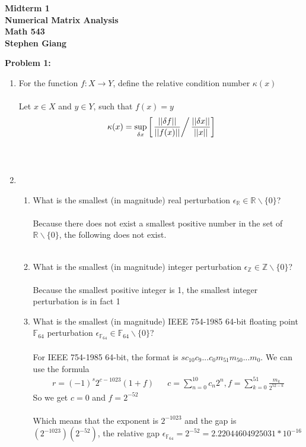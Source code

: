 \documentclass[12pt]{article}
\begin{document}
	
	\begin{center}
		\textbf{Midterm 1} \\
		\textbf{Numerical Matrix Analysis} \\
		\textbf{Math 543} \\
		\textbf{Stephen Giang} \\
	\end{center}

\noindent \textbf{Problem 1: }
	\begin{enumerate}[label = (\alph*)]
		\item For the function $f : X \rightarrow Y$, define the relative condition number $\kappa(x)$ 
		\\ \\
		Let $x \in X$ and $y \in Y$, such that $f(x) = y$
		$$
		\kappa(x) = \sup \limits_{\delta x} \left[\left.\frac{||\delta f||}{||f(x) ||} \right/ \frac{||\delta x||}{||x||}\right]
		$$
		\\ \\
		\item 
		\begin{enumerate}[label = (\roman*)]
			\item What is the smallest (in magnitude) real perturbation $\epsilon_{\mathbb{R}} \in \mathbb{R}\backslash\{0\}$?
			\\ \\ 
			Because there does not exist a smallest positive number in the set of $\mathbb{R}\backslash\{0\}$, the following does not exist. 
			\\ \\
			
			\item What is the smallest (in magnitude) integer perturbation $\epsilon_{\mathbb{Z}} \in \mathbb{Z}\backslash\{0\}$? 
			\\ \\ 
			Because the smallest positive integer is 1, the smallest integer perturbation is in fact 1 
			
			\newpage
			
			\item What is the smallest (in magnitude) IEEE 754-1985 64-bit floating point $\mathbb{F}_{64}$ perturbation $\epsilon_{\mathbb{F}_{64}} \in \mathbb{F}_{64}\backslash\{0\}$? 
			\\ \\
			For IEEE 754-1985 64-bit, the format is $ sc_{10}c_9...c_0m_{51}m_{50}...m_0$.  We can use the formula 
			\begin{align*}
			r = (-1)^s2^{c - 1023}(1 + f) && c = \sum_{n = 0}^{10}c_n2^n, f = \sum_{k = 0}^{51}\frac{m_k}{2^{52-k}}
			\end{align*}
			So we get $c = 0$ and $f = 2^{-52}$
			\\ \\
			Which means that the exponent is $2^{-1023}$ and the gap is $(2^{-1023})(2^{-52})$, the relative gap $\epsilon_{\mathbb{F}_{64}} = 2^{-52} = 2.22044604925031 * 10^{-16}$		
			\\ \\ \\ \\
			

\end{enumerate}
\end{enumerate}
\end{document}

